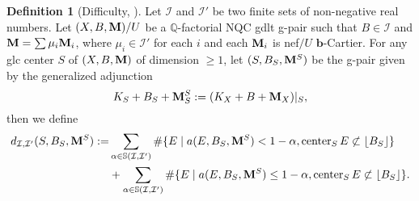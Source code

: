 \documentclass[11pt]{amsart}
\numberwithin{equation}{section}
\newcommand{\bb}{\bm{b}}
\newcommand{\Mm}{{\bf{M}}}
\newcommand{\Qq}{\mathbb{Q}}
\newcommand{\Center}{\operatorname{center}}
\newcommand{\Ii}{\mathcal{I}}
\theoremstyle{definition}
\newtheorem{defn}[thm]{Definition}
\theoremstyle{definition}
\theoremstyle{definition}
\begin{document}
\begin{defn}[Difficulty, {\cite[Definition 4.3]{HL18}}]\label{defn: gpair difficulty}
Let $\Ii$ and $\Ii'$ be two finite sets of non-negative real numbers. Let $(X,B,\Mm)/U$ be a $\Qq$-factorial NQC gdlt g-pair such that $B\in\Ii$ and $\Mm=\sum\mu_i\Mm_i$, where $\mu_i\in\Ii'$ for each $i$ and each $\Mm_i$ is nef$/U$ $\bb$-Cartier. For any glc center $S$ of $(X,B,\Mm)$ of dimension $\geq 1$, let $(S,B_S,\Mm^S)$ be the g-pair given by the generalized adjunction
$$K_S+B_S+\Mm^S_S:=(K_X+B+\Mm_X)|_S,$$
then we define
\begin{align*}
    d_{\Ii,\Ii'}(S,B_S,\Mm^S):=&\sum_{\alpha\in\mathbb S(\Ii,\Ii')}\#\{E\mid a(E,B_S,\Mm^S)<1-\alpha,\Center_SE\not\subset\lfloor B_S\rfloor\}\\
    &+\sum_{\alpha\in\mathbb S(\Ii,\Ii')}\#\{E\mid a(E,B_S,\Mm^S)\leq 1-\alpha,\Center_SE\not\subset\lfloor B_S\rfloor\}.
\end{align*}
\end{defn}
\end{document}
